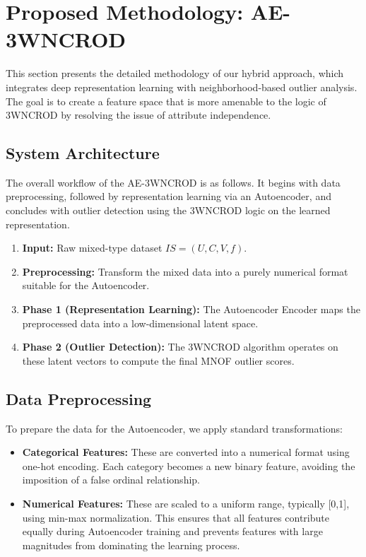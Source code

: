 \documentclass[12pt,a4paper]{article}
\begin{document}
\section{Proposed Methodology: AE-3WNCROD}

This section presents the detailed methodology of our hybrid approach, which integrates deep representation learning with neighborhood-based outlier analysis. The goal is to create a feature space that is more amenable to the logic of 3WNCROD by resolving the issue of attribute independence.

\subsection{System Architecture}

The overall workflow of the AE-3WNCROD is as follows. It begins with data preprocessing, followed by representation learning via an Autoencoder, and concludes with outlier detection using the 3WNCROD logic on the learned representation.

\begin{enumerate}
\item \textbf{Input:} Raw mixed-type dataset $IS=(U, C, V, f)$.
\item \textbf{Preprocessing:} Transform the mixed data into a purely numerical format suitable for the Autoencoder.
\item \textbf{Phase 1 (Representation Learning):} The Autoencoder Encoder maps the preprocessed data into a low-dimensional latent space.
\item \textbf{Phase 2 (Outlier Detection):} The 3WNCROD algorithm operates on these latent vectors to compute the final MNOF outlier scores.
\end{enumerate}

\subsection{Data Preprocessing}

To prepare the data for the Autoencoder, we apply standard transformations:

\begin{itemize}
\item \textbf{Categorical Features:} These are converted into a numerical format using one-hot encoding. Each category becomes a new binary feature, avoiding the imposition of a false ordinal relationship.
\item \textbf{Numerical Features:} These are scaled to a uniform range, typically [0,1], using min-max normalization. This ensures that all features contribute equally during Autoencoder training and prevents features with large magnitudes from dominating the learning process.
\end{itemize}
\end{document}
